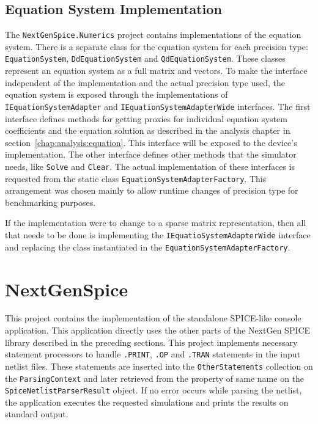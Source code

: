 \subsection{Equation System Implementation}
The \texttt{NextGenSpice.Numerics} project contains implementations of the equation system. There is a separate class for the equation system for each precision type: \texttt{EquationSystem}, \texttt{DdEquationSystem} and \texttt{QdEquationSystem}. These classes represent an equation system as a full matrix and vectors. To make the interface independent of the implementation and the actual precision type used, the equation system is exposed through the implementations of \texttt{IEquationSystem\+Adapter} and \texttt{IEquationSystemAdapterWide} interfaces. The first interface defines methods for getting proxies for individual equation system coefficients and the equation solution as described in the analysis chapter in section~\ref{chap:analysis:equation}. This interface will be exposed to the device's implementation. The other interface defines other methods that the simulator needs, like \texttt{Solve} and \texttt{Clear}. The actual implementation of these interfaces is requested from the static class \texttt{EquationSystemAdapterFactory}. This arrangement was chosen mainly to allow runtime changes of precision type for benchmarking purposes.

If the implementation were to change to a sparse matrix representation, then all that needs to be done is implementing the \texttt{IEquatioSystemAdapterWide} interface and replacing the class instantiated in the \texttt{EquationSystemAdapterFactory}.

\section{NextGenSpice}
This project contains the implementation of the standalone SPICE-like console application. This application directly uses the other parts of the NextGen SPICE library described in the preceding sections. This project implements necessary statement processors to handle \texttt{.PRINT}, \texttt{.OP} and \texttt{.TRAN} statements in the input netlist files. These statements are inserted into the \texttt{OtherStatements} collection on the \texttt{ParsingContext} and later retrieved from the property of same name on the \texttt{SpiceNetlistParserResult} object. If no error occurs while parsing the netlist, the application executes the requested simulations and prints the results on standard output.

